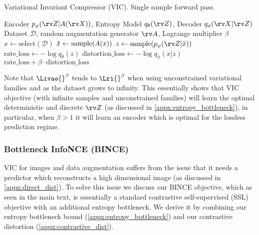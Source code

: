 \documentclass[final]{article}
\begin{document}
\begin{algorithm}[H]
\caption{Variational Invariant Compressor (VIC). Single sample forward pass.}
\label{alg:vic}
    \begin{algorithmic}[1]
    \Require Encoder $p_{\varphi}(\rv Z | A(\rv X))$,  Entropy Model $q_{\theta}(\rv Z)$,  Decoder $q_{\phi}(\rv X | \rv Z)$
    \Require Dataset $\mathcal{D}$, random augmentation generator $\rv A$, Lagrange multiplier $\beta$
    \State $x  \leftarrow  \mathrm{select}(\mathcal{D})$  
    \State $\Tilde{x} \leftarrow \text{sample}(A(x))$ 
    \State $z \leftarrow \mathrm{sample}(p_{\varphi}(\rv Z | \Tilde{x} ))$ 
    \State $\mathrm{rate\_loss} \leftarrow - \log q_{\theta}(z) $ 
    \State $\mathrm{distortion\_loss}  \leftarrow - \log q_{\phi}(x | z ) $  \\
    \Return $\mathrm{rate\_loss} + \beta \cdot \mathrm{distortion\_loss}$
\end{algorithmic}
\end{algorithm} 
Note that $\Livae{}^\beta$ tends to $\Lri{}^\beta$ when using unconstrained variational families and as the dataset grows to infinity.
This essentially shows that VIC objective (with infinite samples and unconstrained families) will learn the optimal deterministic and discrete $\rv Z$ (as discussed in \cref{appx:entropy_bottleneck}), in particular, when $\beta > 1$ it will learn an encoder which is optimal for the lossless prediction regime.

\subsubsection{Bottleneck InfoNCE (BINCE)}

VIC for images and data augmentation suffers from the issue that it needs a predictor which reconstructs a high dimensional image (as discussed in \cref{appx:direct_dist}).
To solve this issue we discuss our BINCE objective, which as seen in the main text, is essentially a standard contrastive self-supervised (SSL) objective with an additional entropy bottleneck.
We derive it by combining our entropy bottleneck bound (\cref{appx:entropy_bottleneck}) and our contrastive distortion (\cref{appx:contrastive_dist}).
\end{document}
